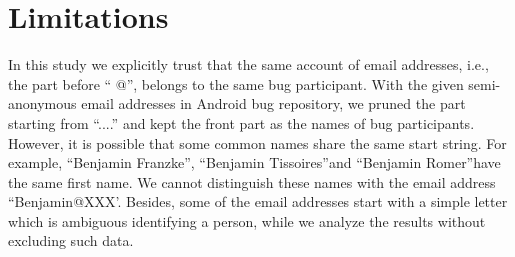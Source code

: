 \documentclass[10pt, conference, compsocconf]{IEEEtran}
\begin{document}


%
%





\section{Limitations}
\label{limitation}

In this study we explicitly trust that the same account of email
addresses, i.e., the part before \textquotedblleft
@\textquotedblright, belongs to the same bug participant. With the
given semi-anonymous email addresses in Android bug repository, we
pruned the part starting from \textquotedblleft ....\textquotedblright
and kept the front part as the names of bug participants. However, it
is possible that some common names share the same start string. For
example, \textquotedblleft Benjamin Franzke\textquotedblright,
\textquotedblleft Benjamin Tissoires\textquotedblright  and
\textquotedblleft Benjamin Romer\textquotedblright  have the same
first name. We cannot distinguish these names with the email address
\textquotedblleft Benjamin@XXX'. Besides, some of the email addresses
start with a simple letter which is ambiguous identifying a person,
while we analyze the results without excluding such data.
\end{document}
